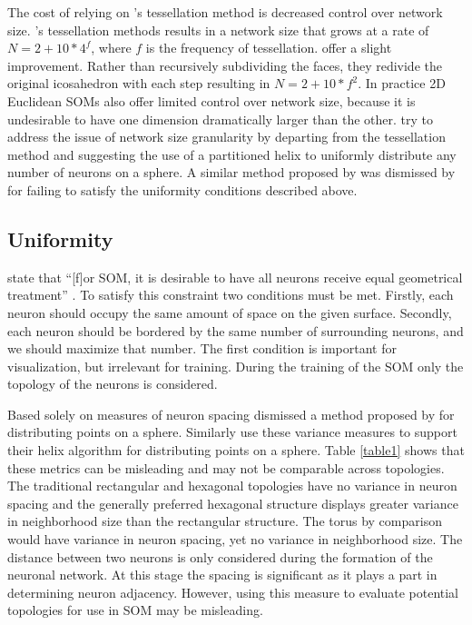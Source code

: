 \documentclass[10pt,titlepage]{article}
\begin{document}
The cost of relying on \citeauthor{ritter99}'s tessellation method is decreased
control over network size. \citeauthor{ritter99}'s tessellation methods results
in a network size that grows at a rate of \(N=2+10*4^f\), where $f$ is the
frequency of tessellation. \cite{wu2006} offer a slight improvement. Rather than
recursively subdividing the faces, they redivide the original icosahedron with
each step resulting in \(N=2+10*f^2\).  In practice 2D Euclidean SOMs also offer
limited control over network size, because it is undesirable to have one dimension
dramatically larger than the other.  \cite{Nishio:2006fk} try to address the
issue of network size granularity by departing from the tessellation method and
suggesting the use of a partitioned helix to uniformly distribute any number of
neurons on a sphere.  A similar method proposed by \cite{Rakhmanov94} was
dismissed by \cite{wu2005} for failing to satisfy the uniformity conditions
described above.

\subsection{Uniformity}
\citeauthor{wu2006} state that ``[f]or SOM, it is desirable to have all neurons
receive equal geometrical treatment'' \cite[pp. 900]{wu2006}.  To satisfy this
constraint two conditions must be met.  Firstly, each neuron should occupy the
same amount of space on the given surface.  Secondly, each neuron should be
bordered by the same number of surrounding neurons, and we should maximize that
number.  The first condition is important for visualization, but
irrelevant for training.  During the training of the SOM only the topology of
the neurons is considered.

Based solely on measures of neuron spacing \cite{wu2005} dismissed a method
proposed by \cite{Rakhmanov94} for distributing points on a sphere.  Similarly
\cite{Nishio:2006fk} use these variance measures to support their helix
algorithm for distributing points on a sphere.  Table \ref{table1} shows that
these metrics can be misleading and may not be comparable across topologies.
The traditional rectangular and hexagonal topologies have no variance in neuron
spacing and the generally preferred hexagonal structure displays greater
variance in neighborhood size than the rectangular structure.  The torus by
comparison would have variance in neuron spacing, yet no variance in
neighborhood size.  The distance between two neurons is only considered during
the formation of the neuronal network.  At this stage the spacing is significant
as it plays a part in determining neuron adjacency. However, using this measure
to evaluate potential topologies for use in SOM may be misleading.
\end{document}
